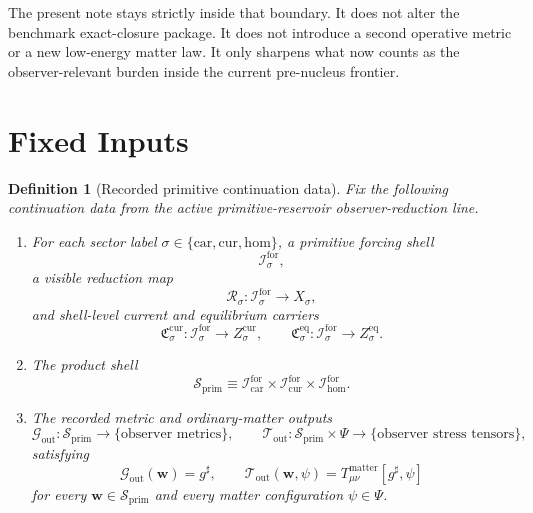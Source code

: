 \documentclass[11pt]{article}
\newcommand{\CompletedMetric}{g^{\sharp}}
\newcommand{\MatterSpace}{\Psi}
\newcommand{\Car}{\mathrm{car}}
\newcommand{\Cur}{\mathrm{cur}}
\newcommand{\Hom}{\mathrm{hom}}
\newcommand{\ForSpace}[1]{\mathcal I_{#1}^{\mathrm{for}}}
\newcommand{\PrimShell}{\mathcal S_{\mathrm{prim}}}
\newcommand{\Reduction}[1]{\mathcal R_{#1}}
\newcommand{\CurrentCarrier}[1]{\mathfrak C_{#1}^{\mathrm{cur}}}
\newcommand{\EqCarrier}[1]{\mathfrak C_{#1}^{\mathrm{eq}}}
\newcommand{\MetricOut}{\mathscr G_{\mathrm{out}}}
\newcommand{\MatterOut}{\mathscr T_{\mathrm{out}}}
\newtheorem{definition}{Definition}
\begin{document}
The present note stays strictly inside that boundary. It does not alter the benchmark exact-closure package. It does not introduce a second operative metric or a new low-energy matter law. It only sharpens what now counts as the observer-relevant burden inside the current pre-nucleus frontier.

\section{Fixed Inputs}

\begin{definition}[Recorded primitive continuation data]
\label{def:fixed}
Fix the following continuation data from the active primitive-reservoir observer-reduction line.
\begin{enumerate}
    \item For each sector label \(\sigma\in\{\Car,\Cur,\Hom\}\), a primitive forcing shell
    \[
    \ForSpace{\sigma},
    \]
    a visible reduction map
    \[
    \Reduction{\sigma}:\ForSpace{\sigma}\to X_{\sigma},
    \]
    and shell-level current and equilibrium carriers
    \[
    \CurrentCarrier{\sigma}:\ForSpace{\sigma}\to Z_{\sigma}^{\mathrm{cur}},
    \qquad
    \EqCarrier{\sigma}:\ForSpace{\sigma}\to Z_{\sigma}^{\mathrm{eq}}.
    \]
    \item The product shell
    \[
    \PrimShell
    \equiv
    \ForSpace{\Car}\times \ForSpace{\Cur}\times \ForSpace{\Hom}.
    \]
    \item The recorded metric and ordinary-matter outputs
    \[
    \MetricOut:\PrimShell\to\{\text{observer metrics}\},
    \qquad
    \MatterOut:\PrimShell\times\MatterSpace\to\{\text{observer stress tensors}\},
    \]
    satisfying
    \begin{equation}
    \MetricOut(\mathbf w)=\CompletedMetric,
    \qquad
    \MatterOut(\mathbf w,\psi)
    =
    T_{\mu\nu}^{\mathrm{matter}}[\CompletedMetric,\psi]
    \label{eq:fixedoutputs}
    \end{equation}
    for every \(\mathbf w\in\PrimShell\) and every matter configuration \(\psi\in\MatterSpace\).
\end{enumerate}
\end{definition}
\end{document}
